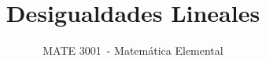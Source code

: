 \documentclass[12pt]{article}
\newcommand{\coursecode}{MATE 3001}      %
\newcommand{\coursename}{Matemática Elemental}     %
\newcommand{\lessontitle}{Desigualdades Lineales}    %
\newif\ifshowsolutions
\begin{document}
\title{\lessontitle}
\author{\coursecode\ - \coursename}
\date{}
\maketitle

\setcounter{section}{12}




\ifshowsolutions
    \newpage
    \section*{Soluciones}
    
\fi
\end{document}

